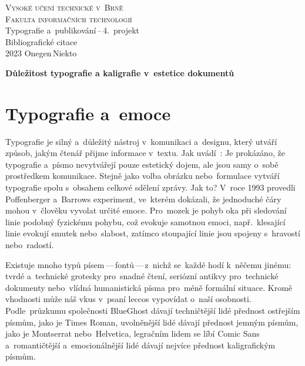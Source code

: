 \documentclass[a4paper, 11pt]{article}
\begin{document}
\begin{titlepage}
	\begin{center}
		{\Huge \textsc{Vysoké učení technické v~Brně}\\}
		{\huge \textsc{Fakulta informačních technologií}\\}
		{\LARGE Typografie a~publikování\,--\,4.\ projekt\\}
		{\Huge Bibliografické citace\\}
		{\Large 2023 \hfill Onegen\,Niekto}
	\end{center}
\end{titlepage}

\begin{center}
	\Large
	\textbf{Důležitost typografie a kaligrafie v~estetice dokumentů}
	\bigskip
\end{center}
\section*{Typografie a~emoce}

Typografie je silný a~důležitý nástroj v~komunikaci a~designu, který utváří
způsob, jakým čtenář přijme informace v~textu.
Jak uvádí~\textcite{Koch:2012:EmotionIT}: 
Je prokázáno, že typografie a~písmo nevytvářejí pouze estetický dojem,
ale jsou samy o~sobě prostředkem komunikace. Stejně jako volba obrázku
nebo~formulace vytváří typografie spolu s~obsahem
celkové sdělení zprávy. \parencite{Pilka:2019:CharakterPisma}
Jak to? V~roce 1993 provedli Poffenberger a~Barrows experiment,
ve~kterém dokázali, že jednoduché čáry mohou v~člověku vyvolat určité emoce.
Pro~mozek je pohyb oka při sledování linie podobný fyzickému pohybu,
což evokuje samotnou emoci, např.~klesající linie evokují smutek nebo~slabost,
zatímco stoupající linie jsou spojeny s~hravostí nebo~radostí.
\parencite{Sladovnikova:2021:EmoceTextu}

Existuje mnoho typů písem\,---\,fontů\,---\,z~nichž se~každé hodí k~něčemu
jinému: tvrdé a~technické grotesky pro~snadné čtení, seriózní antikvy
pro~technické dokumenty nebo~vlídná humanistická písma pro~méně formální situace.
\parencite{Samara:2010:ZakladyDesignu}
Kromě vhodnosti může náš vkus v~psaní leccos vypovídat o~naší osobnosti.
Podle~průzkumu společnosti BlueGhost dávají techničtější lidé přednost ostřejším
písmům, jako je Times Roman, uvolněnější lidé dávají přednost jemným písmům,
jako je Montserrat nebo~Helvetica, legračním lidem se líbí Comic Sans
a~romantičtější a~emocionálnější lidé dávají nejvíce přednost kaligrafickým písmům.
\parencite{Pilka:2019:CharakterPisma}
\end{document}
